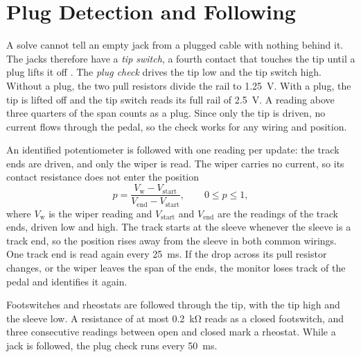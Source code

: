 
\section{Plug Detection and Following}
\label{sec:following}

A solve cannot tell an empty jack from a plugged cable with nothing behind it. The jacks therefore have a \emph{tip switch}, a fourth contact that touches the tip until a plug lifts it off \cite{neutrik2026nmj6hfd2}. The \emph{plug check} drives the tip low and the tip switch high. Without a plug, the two pull resistors divide the rail to \qty{1.25}{\volt}. With a plug, the tip is lifted off and the tip switch reads its full rail of \qty{2.5}{\volt}. A reading above three quarters of the span counts as a plug. Since only the tip is driven, no current flows through the pedal, so the check works for any wiring and position.

An identified potentiometer is followed with one reading per update: the track ends are driven, and only the wiper is read. The wiper carries no current, so its contact resistance does not enter the position
\begin{equation}
  p = \frac{V_\mathrm{w} - V_\mathrm{start}}{V_\mathrm{end} - V_\mathrm{start}}, \qquad 0 \leq p \leq 1,
  \label{eq:position}
\end{equation}
where $V_\mathrm{w}$ is the wiper reading and $V_\mathrm{start}$ and $V_\mathrm{end}$ are the readings of the track ends, driven low and high. The track starts at the sleeve whenever the sleeve is a track end, so the position rises away from the sleeve in both common wirings. One track end is read again every \qty{25}{\milli\second}. If the drop across its pull resistor changes, or the wiper leaves the span of the ends, the monitor loses track of the pedal and identifies it again.

Footswitches and rheostats are followed through the tip, with the tip high and the sleeve low. A resistance of at most \qty{0.2}{\kilo\ohm} reads as a closed footswitch, and three consecutive readings between open and closed mark a rheostat. While a jack is followed, the plug check runs every \qty{50}{\milli\second}.
